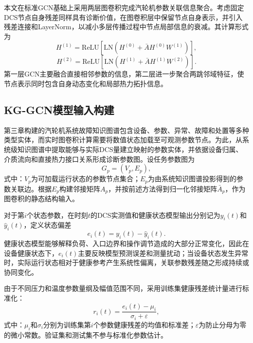 本文在标准GCN基础上采用两层图卷积完成汽轮机参数关联信息聚合。考虑固定DCS节点自身残差同样具有诊断价值，在图卷积层中保留节点自身表示，并引入残差连接和LayerNorm，以减小多层传播过程中节点局部信息的衰减。其计算形式为
\begin{equation}
H^{(1)}=\mathrm{ReLU}\left[\mathrm{LN}\left(H^{(0)}+\bar A H^{(0)}W^{(1)}\right)\right],
\end{equation}
\begin{equation}
H^{(2)}=\mathrm{ReLU}\left[\mathrm{LN}\left(H^{(1)}+\bar A H^{(1)}W^{(2)}\right)\right].
\end{equation}
第一层GCN主要融合直接相邻参数的信息，第二层进一步聚合两跳邻域特征，使节点表示同时包含自身动态变化和局部热力拓扑信息。

\subsection{KG-GCN模型输入构建}
\label{subsec:kg_input_v6}

第三章构建的汽轮机系统故障知识图谱包含设备、参数、异常、故障和处置等多种类型实体，而实时图卷积计算需要将数值状态加载至可观测参数节点。为此，从系统级知识图谱中提取能够与实际DCS量建立映射的参数实体，并依据设备归属、介质流向和直接热力接口关系形成诊断参数图。设任务参数图为
\begin{equation}
G_p=(V_p,E_p),
\end{equation}
式中：$V_p$为可加载运行状态的参数节点集合；$E_p$为由系统知识图谱投影得到的参数关联边。根据$E_p$构建邻接矩阵$A_p$，并按前述方法得到归一化邻接矩阵$\bar A_p$，作为图卷积的静态结构输入。

对于第$i$个状态参数，在时刻$t$的DCS实测值和健康状态模型输出分别记为$y_i(t)$和$\hat y_i(t)$，定义状态偏差
\begin{equation}
e_i(t)=y_i(t)-\hat y_i(t).
\end{equation}
健康状态模型能够解释负荷、入口边界和操作调节造成的大部分正常变化，因此在设备健康状态下，$e_i(t)$主要反映模型预测误差和测量扰动；当设备状态发生异常时，实际运行状态相对于健康参考产生系统性偏离，关联参数残差随之形成持续或协同变化。

由于不同压力和温度参数量纲及幅值范围不同，采用训练集健康残差统计量进行标准化：
\begin{equation}
r_i(t)=\frac{e_i(t)-\mu_i}{\sigma_i+\varepsilon},
\end{equation}
式中：$\mu_i$和$\sigma_i$分别为训练集第$i$个参数健康残差的均值和标准差；$\varepsilon$为防止分母为零的微小常数。验证集和测试集不参与标准化参数估计。

